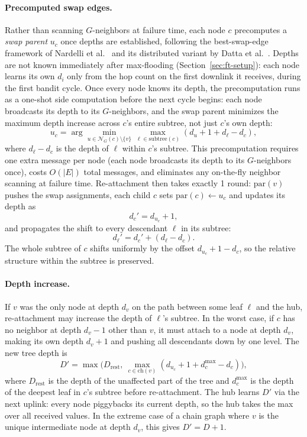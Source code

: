\documentclass{article}
\begin{document}
\paragraph{Precomputed swap edges.} Rather than scanning $G$-neighbors at failure time,
each node $c$ precomputes a \emph{swap parent} $u_c$ once depths are established,
following the best-swap-edge framework of Nardelli et al.\ \citep{nardelli2003} and its
distributed variant by Datta et al.\ \citep{datta2013}. Depths are not known immediately
after max-flooding (Section~\ref{sec:ft-setup}): each node learns its own $d_i$ only from
the hop count on the first downlink it receives, during the first bandit cycle. Once
every node knows its depth, the precomputation runs as a one-shot side computation
before the next cycle begins: each node broadcasts its depth to its $G$-neighbors, and
the swap parent minimizes the maximum depth increase across $c$'s entire subtree, not
just $c$'s own depth:
\[
    u_c = \arg\min_{u \in \mathcal{N}_G(c) \setminus \{v\}} \max_{\ell \in \mathrm{subtree}(c)} (d_u + 1 + d_\ell - d_c),
\]
where $d_\ell - d_c$ is the depth of $\ell$ within $c$'s subtree. This precomputation
requires one extra message per node (each node broadcasts its depth to its
$G$-neighbors once), costs $O(|E|)$ total messages, and
eliminates any on-the-fly neighbor scanning at failure time. Re-attachment then takes
exactly 1 round: $\mathrm{par}(v)$ pushes the swap assignments, each child $c$ sets
$\mathrm{par}(c) \leftarrow u_c$ and updates its depth as
\[
    d_c' = d_{u_c} + 1,
\]
and propagates the shift to every descendant $\ell$ in its subtree:
\[
    d_\ell' = d_c' + (d_\ell - d_c).
\]
The whole subtree of $c$ shifts uniformly by the offset $d_{u_c} + 1 - d_c$, so the
relative structure within the subtree is preserved.

\paragraph{Depth increase.} If $v$ was the only node at depth $d_v$ on the path between
some leaf $\ell$ and the hub, re-attachment may increase the depth of $\ell$'s subtree.
In the worst case, if $c$ has no neighbor at depth $d_v - 1$ other than $v$, it must
attach to a node at depth $d_v$, making its own depth $d_v + 1$ and pushing all
descendants down by one level. The new tree depth is
\[
    D' = \max\bigl(D_{\mathrm{rest}},\ \max_{c \in \mathrm{ch}(v)} (d_{u_c} + 1 + d_c^{\max} - d_c)\bigr),
\]
where $D_{\mathrm{rest}}$ is the depth of the unaffected part of the tree and
$d_c^{\max}$ is the depth of the deepest leaf in $c$'s subtree before re-attachment.
The hub learns $D'$ via the next uplink: every node piggybacks its current depth, so
the hub takes the max over all received values. In the extreme case of a chain graph
where $v$ is the unique intermediate node at depth $d_v$, this gives $D' = D + 1$.
\end{document}
